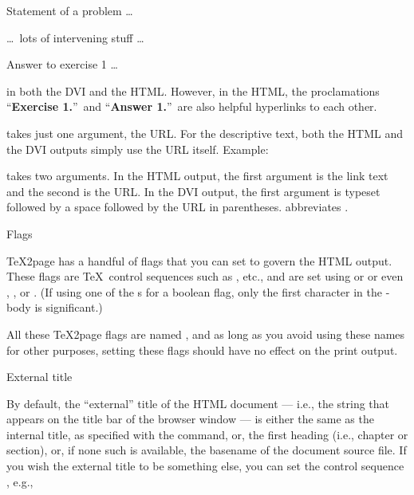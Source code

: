 \quote

 Statement of a problem \dots

\n \dots\ lots of intervening stuff \dots

 Answer to exercise 1 \dots

\endquote

\n in both the DVI and the HTML.  However, in the
HTML, the proclamations “{\bf Exercise 1.}”\ and
“{\bf Answer 1.}”\ are also helpful hyperlinks to each other.

\p{\url} takes just one argument, the URL.  For the
descriptive text, both the HTML and the DVI outputs simply
use the URL itself.   Example:


\p{\urlp} takes two arguments.  In the HTML output,
the first argument is the link text and the second is
the URL.  In the DVI output, the first argument is
typeset followed by a space followed by the URL in
parentheses.   abbreviates
.

 Flags

%
\TeX2page has a handful of flags that you can set to govern the HTML output.
These flags are \TeX\ control sequences such as
\p{\TZPcolophondisabletimestamp},
etc., and are set using \p{\let} or \p{\def} or even \p{\gdef},
\p{\edef}, or \p{\xdef}.
(If using one of the \p{\def}s for a boolean flag, only the
first character in the \p{\def}-body is significant.)

All these \TeX2page flags are named , and as long as
you avoid using these names for other purposes, setting these
flags should have no effect on the print output.

\beginsection External title

%
By default, the “external” title of the HTML document —
i.e., the string that appears on the title bar of the
browser window — is either the same as the internal title,
as specified with the \p{\title} command, or, the first heading
(i.e., chapter or section),
or, if none such is
available, the basename of the document source file.  If you
wish the external title to be something else, you can set
the control sequence \p{\TZPtitle}, e.g.,


